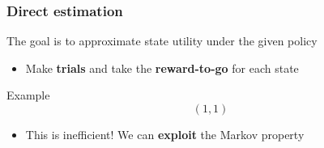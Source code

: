 \documentclass{beamer}
\begin{document}
\begin{frame}
	\frametitle{Direct estimation}
	The goal is to approximate state utility under the given policy
	\begin{itemize}
		\item Make \textbf{trials} and take the \textbf{reward-to-go} for each state
	\end{itemize}
	\begin{block}{Example}
	$$
	(1,1) 
	$$
	\end{block}
	\begin{itemize}
		\item This is inefficient! We can \textbf{exploit} the Markov property 
	\end{itemize}
\end{frame}
\end{document}
